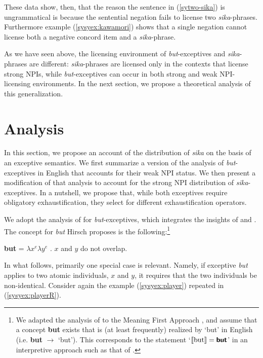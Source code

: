 \documentclass[output=paper,colorlinks,citecolor=brown,
]{langscibook}
\let\l\lambda
\def\refp#1{(\ref{sy#1})}
\begin{document}
These data show, then, that the reason the sentence in (\ref{sytwo-sika}) is ungrammatical is because the sentential negation fails to license two \emph{sika}-phrases.  
Furthermore example \refp{syex:kawamori} shows that a single negation cannot license both a negative concord item and a \emph{sika}-phrase.

As we have seen above, the licensing environment of \emph{but}-exceptives and \emph{sika}-phrases are different: \emph{sika}-phrases are licensed only in the contexts that license strong NPIs, while \emph{but}-exceptives can occur in both strong and weak NPI-licensing environments.  In the next section, we propose a theoretical analysis of this generalization.


\def\textsb#1{\textsf{\textbf{#1}}}

\section{Analysis}\label{sysc:analysis}

In this section, we propose an account of the distribution of \emph{sika} on the basis of an exceptive semantics.
We first summarize a version of the analysis of \emph{but}-exceptives in English that accounts for their weak NPI status.
We then present a modification of that analysis to account for the strong NPI distribution of \emph{sika}-exceptives. In a nutshell, we propose that, while both exceptives require obligatory exhaustification, they select for different exhaustification operators.


We adopt the analysis of \cite{hirsch16b} for \emph{but}-exceptives, which integrates the insights of \cite{fintel93} and \cite{gajewski08b}.
The concept for \emph{but} Hirsch proposes is the following:\footnote{We adapted the analysis of \cite{hirsch16b} to the Meaning First Approach \citep{sauerland20b}, and assume that a concept \textsb{but} exists that is (at least frequently) realized by `but' in English (i.e. \textbf{but} $\longrightarrow$ `but').  This corresponds to the statement `$[\![\textrm{but}]\!] = \textsb{but}$' in an interpretive approach such as that of \cite{heim98}.} 

\ea \label{syex:but}
    \textsb{but} = $\l x^e  \l y^e$ . $x$ and $y$ do not overlap.\z

In what follows, primarily one special case is relevant. Namely, if exceptive \emph{but} applies to two atomic individuals, $x$ and $y$, it requires that the two individuals be non-identical.  
Consider again the example \refp{syex:player} repeated in \refp{syex:playerR}.
\end{document}
